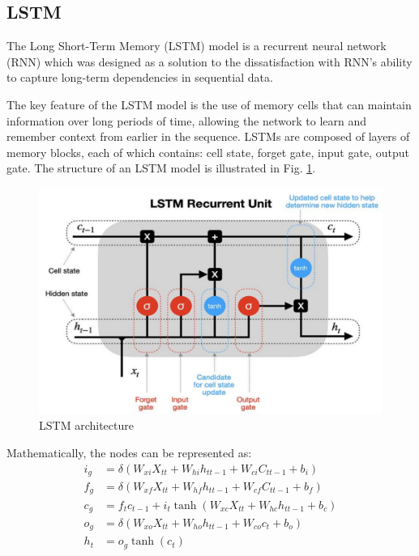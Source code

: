 \documentclass[conference]{IEEEtran}
\begin{document}
\subsection{LSTM}\label{method_LSTM}
The Long Short-Term Memory (LSTM) model is a recurrent neural network (RNN) which was designed as a solution to the dissatisfaction with RNN’s ability to capture long-term dependencies in sequential data.\par
The key feature of the LSTM model is the use of memory cells that can maintain information over long periods of time, allowing the network to learn and remember context from earlier in the sequence. LSTMs are composed of layers of memory blocks, each of which contains: cell state, forget gate, input gate, output gate. The structure of an LSTM model is illustrated in Fig. \ref{fig_LSTM_architecture}.
\begin{figure}[H]
    \centering
    \begin{minipage}{0.45\textwidth}
    \centering
    \includegraphics[width=1\textwidth]{figures/method/LSTM_Architecture.png}
    \caption{LSTM architecture}
    \label{fig_LSTM_architecture}
    \end{minipage}
\end{figure}\par
Mathematically, the nodes can be represented as:
\begin{align}
i_g &= \delta(W_{xi}X_{tt} + W_{hi}h_{tt-1} + W_{ci}C_{tt-1} + b_i)\label{eq_lstm_1} \\
f_g &= \delta(W_{xf}X_{tt} + W_{hf}h_{tt-1} + W_{cf}C_{tt-1} + b_f)\label{eq_lstm_2} \\
c_g &= f_tc_{t-1} + i_t\tanh(W_{xc}X_{tt} + W_{hc}h_{tt-1} + b_c)\label{eq_lstm_3} \\
o_g &= \delta(W_{xo}X_{tt} + W_{ho}h_{tt-1} + W_{co}c_t + b_o)\label{eq_lstm_4} \\
h_t &= o_g\tanh(c_t)\label{eq_lstm_5}
\end{align}\par
\end{document}
